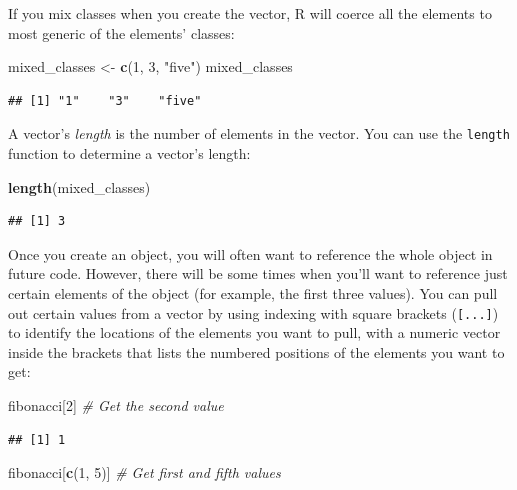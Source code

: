 \documentclass[]{book}
\makeatletter
\newenvironment{Shaded}{\begin{snugshade}}{\end{snugshade}}
\newcommand{\KeywordTok}[1]{\textcolor[rgb]{0.13,0.29,0.53}{\textbf{{#1}}}}
\newcommand{\DecValTok}[1]{\textcolor[rgb]{0.00,0.00,0.81}{{#1}}}
\newcommand{\StringTok}[1]{\textcolor[rgb]{0.31,0.60,0.02}{{#1}}}
\newcommand{\CommentTok}[1]{\textcolor[rgb]{0.56,0.35,0.01}{\textit{{#1}}}}
\newcommand{\NormalTok}[1]{{#1}}
\newenvironment{kframe}{%
\medskip{}
\setlength{\fboxsep}{.8em}
 \def\at@end@of@kframe{}%
 \ifinner\ifhmode%
  \def\at@end@of@kframe{\end{minipage}}%
  \begin{minipage}{\columnwidth}%
 \fi\fi%
 \def\FrameCommand##1{\hskip\@totalleftmargin \hskip-\fboxsep
 \colorbox{shadecolor}{##1}\hskip-\fboxsep
     \hskip-\linewidth \hskip-\@totalleftmargin \hskip\columnwidth}%
 \MakeFramed {\advance\hsize-\width
   \@totalleftmargin\z@ \linewidth\hsize
   \@setminipage}}%
 {\par\unskip\endMakeFramed%
 \at@end@of@kframe}
\renewenvironment{Shaded}{\begin{kframe}}{\end{kframe}}
\makeatother
\begin{document}
If you mix classes when you create the vector, R will coerce all the
elements to most generic of the elements' classes:

\begin{Shaded}
\begin{Highlighting}[]
\NormalTok{mixed_classes <-}\StringTok{ }\KeywordTok{c}\NormalTok{(}\DecValTok{1}\NormalTok{, }\DecValTok{3}\NormalTok{, }\StringTok{"five"}\NormalTok{)}
\NormalTok{mixed_classes}
\end{Highlighting}
\end{Shaded}

\begin{verbatim}
## [1] "1"    "3"    "five"
\end{verbatim}

A vector's \emph{length} is the number of elements in the vector. You
can use the \texttt{length} function to determine a vector's length:

\begin{Shaded}
\begin{Highlighting}[]
\KeywordTok{length}\NormalTok{(mixed_classes)}
\end{Highlighting}
\end{Shaded}

\begin{verbatim}
## [1] 3
\end{verbatim}

Once you create an object, you will often want to reference the whole
object in future code. However, there will be some times when you'll
want to reference just certain elements of the object (for example, the
first three values). You can pull out certain values from a vector by
using indexing with square brackets (\texttt{{[}...{]}}) to identify the
locations of the elements you want to pull, with a numeric vector inside
the brackets that lists the numbered positions of the elements you want
to get:

\begin{Shaded}
\begin{Highlighting}[]
\NormalTok{fibonacci[}\DecValTok{2}\NormalTok{] }\CommentTok{# Get the second value}
\end{Highlighting}
\end{Shaded}

\begin{verbatim}
## [1] 1
\end{verbatim}

\begin{Shaded}
\begin{Highlighting}[]
\NormalTok{fibonacci[}\KeywordTok{c}\NormalTok{(}\DecValTok{1}\NormalTok{, }\DecValTok{5}\NormalTok{)] }\CommentTok{# Get first and fifth values}
\end{Highlighting}
\end{Shaded}
\end{document}
